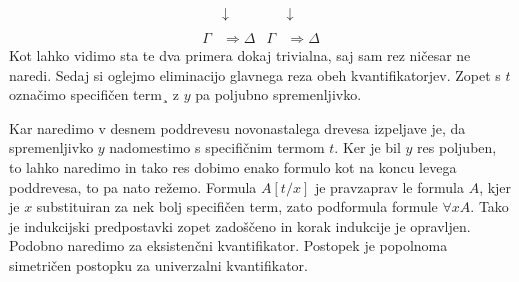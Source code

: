 \begin{align*}
    &\downarrow & &\downarrow \\
    \\
    \Gamma &\Rightarrow \Delta & \Gamma &\Rightarrow \Delta
\end{align*}
Kot lahko vidimo sta te dva primera dokaj trivialna, saj sam rez ničesar ne naredi. Sedaj si oglejmo eliminacijo glavnega reza obeh kvantifikatorjev. Zopet s $t$ označimo specifičen term¸ z $y$ pa poljubno spremenljivko.
\begin{prooftree}


\end{prooftree}
\dol
\begin{prooftree}


\end{prooftree}
Kar naredimo v desnem poddrevesu novonastalega drevesa izpeljave je, da spremenljivko $y$ nadomestimo s specifičnim termom $t$. Ker je bil $y$ res poljuben, to lahko naredimo in tako res dobimo enako formulo kot na koncu levega poddrevesa, to pa nato režemo. Formula $A[t/x]$ je pravzaprav le formula $A$, kjer je $x$ substituiran za nek bolj specifičen term, zato podformula formule $\forall x A$. Tako je indukcijski predpostavki zopet zadoščeno in korak indukcije je opravljen. Podobno naredimo za eksistenčni kvantifikator. Postopek je popolnoma simetričen postopku za univerzalni kvantifikator.
\begin{prooftree}


\end{prooftree}
\dol
\begin{prooftree}

\end{prooftree}
